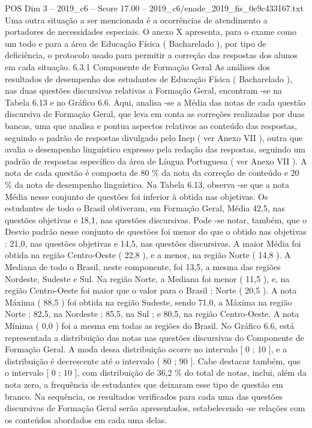 \begin{textsample}{POS Dim 3 – 2019\_c6 – Score 17.00 – 2019\_c6/enade\_2019\_fis\_0e9c433167.txt}
Uma outra situação a ser mencionada é a ocorrências de atendimento a portadores de necessidades especiais.
O anexo X apresenta, para o exame como um todo e para a área de Educação Física ( Bacharelado ), por tipo de deficiência, o protocolo usado para permitir a correção das respostas dos alunos em cada situação. 6.3.1 Componente de Formação Geral As análises dos resultados de desempenho dos estudantes de Educação Física ( Bacharelado ), nas duas questões discursivas relativas a Formação Geral, encontram -se na Tabela 6.13 e no Gráfico 6.6.
Aqui, analisa -se a Média das notas de cada questão discursiva de Formação Geral, que leva em conta as correções realizadas por duas bancas, uma que analisa e pontua aspectos relativos ao conteúdo das respostas, seguindo o padrão de respostas divulgado pelo Inep ( ver Anexo VII ), outra que avalia o desempenho linguístico expresso pela redação das respostas, seguindo um padrão de respostas específico da área de Língua Portuguesa ( ver Anexo VII ).
A nota de cada questão é composta de 80 \% da nota da correção de conteúdo e 20 \% da nota de desempenho linguístico.
Na Tabela 6.13, observa -se que a nota Média nesse conjunto de questões foi inferior à obtida nas objetivas.
Os estudantes de todo o Brasil obtiveram, em Formação Geral, Média 42,5, nas questões objetivas e 18,1, nas questões discursivas.
Pode -se notar, também, que o Desvio padrão nesse conjunto de questões foi menor do que o obtido nas objetivas : 21,0, nas questões objetivas e 14,5, nas questões discursivas.
A maior Média foi obtida na região Centro-Oeste ( 22,8 ), e a menor, na região Norte ( 14,8 ).
A Mediana de todo o Brasil, neste componente, foi 13,5, a mesma das regiões Nordeste, Sudeste e Sul.
Na região Norte, a Mediana foi menor ( 11,5 ), e, na região Centro-Oeste foi maior que o valor para o Brasil : Norte ( 20,5 ).
A nota Máxima ( 88,5 ) foi obtida na região Sudeste, sendo 71,0, a Máxima na região Norte ; 82,5, na Nordeste ; 85,5, na Sul ; e 80,5, na região Centro-Oeste.
A nota Mínima ( 0,0 ) foi a mesma em todas as regiões do Brasil.
No Gráfico 6.6, está representada a distribuição das notas nas questões discursivas do Componente de Formação Geral.
A moda dessa distribuição ocorre no intervalo [ 0 ; 10 ], e a distribuição é decrescente até o intervalo ( 80 ; 90 ].
Cabe destacar também, que o intervalo [ 0 ; 10 ], com distribuição de 36,2 \% do total de notas, inclui, além da nota zero, a frequência de estudantes que deixaram esse tipo de questão em branco.
Na sequência, os resultados verificados para cada uma das questões discursivas de Formação Geral serão apresentados, estabelecendo -se relações com os conteúdos abordados em cada uma delas.

\end{textsample}
